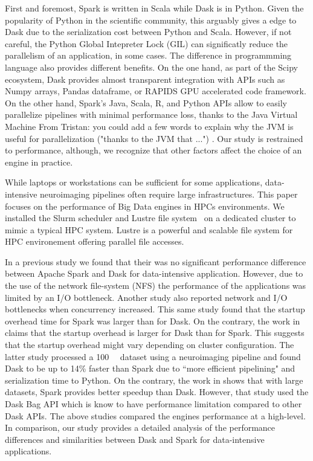 \documentclass[conference]{IEEEtran}
\newcommand{\TG}[1]{\color{cyan}From Tristan: #1 \color{black}}
\begin{document}
First and foremost, Spark is written in Scala while Dask is in Python.
Given the popularity of Python in the scientific community, this arguably gives a edge to Dask due to the serialization cost between Python and Scala.
However, if not careful, the Python Global Intepreter Lock (GIL) can significatly reduce the parallelism of an application, in some cases.
The difference in programmming language also provides different benefits.
On the one hand, as part of the Scipy ecosystem, Dask provides almost transparent integration with APIs such as Numpy arrays, Pandas dataframe, or RAPIDS GPU accelerated code framework.
On the other hand, Spark's Java, Scala, R, and Python APIs allow to easily parallelize pipelines with minimal performance loss, thanks to the Java Virtual Machine \TG{you could add a few words to explain why the JVM is useful for parallelization ("thanks to the JVM that ...")}.
Our study is restrained to performance, although, we recognize that other factors affect the choice of an engine in practice.

While laptops or workstations can be sufficient for some applications, data-intensive neuroimaging pipelines often require large infrastructures.
This paper focuses on the performance of Big Data engines in HPCs environments.
We installed the Slurm scheduler and Lustre file system~\cite{braam2019lustre} on a dedicated cluster to mimic a typical HPC system.
Lustre is a powerful and scalable file system for HPC environement offering parallel file accesses.

In a previous study\cite{8943502} we found that their was no significant performance difference between Apache Spark and Dask for data-intensive application.
However, due to the use of the network file-system (NFS) the performance of the applications was limited by an I/O bottleneck.
Another study \cite{8588652} also reported network and I/O bottlenecks when concurrency increased.
This same study found that the startup overhead time for Spark was larger than for Dask.
On the contrary, the work in~\cite{Mehta:17} claims that the startup overhead is larger for Dask than for Spark.
This suggests that the startup overhead might vary depending on cluster configuration.
The latter study processed a \SI{100}{\giga\byte} dataset using a neuroimaging pipeline and found Dask to be up to 14\% faster than Spark due to ``more efficient pipelining" and serialization time to Python.
On the contrary, the work in \cite{10.1145/3225058.3225128} shows that with large datasets, Spark provides better speedup than Dask.
However, that study used the Dask Bag API which is know to have performance limitation compared to other Dask APIs.
The above studies compared the engines performance at a high-level.
In comparison, our study provides a detailed analysis of the performance differences and similarities between Dask and Spark for data-intensive applications.
\end{document}
